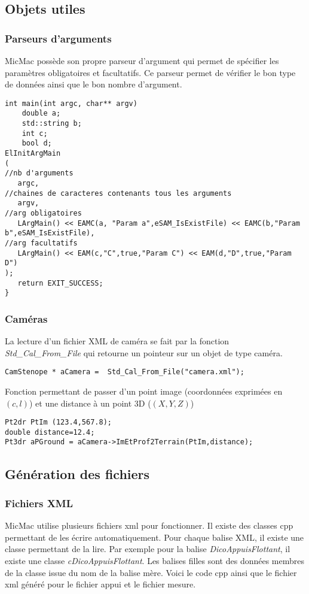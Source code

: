 \documentclass{article}
\begin{document}
\subsection{Objets utiles}

\subsubsection{Parseurs d'arguments}
MicMac possède son propre parseur d'argument qui permet de spécifier les paramètres obligatoires et facultatifs. 
Ce parseur permet de vérifier le bon type de données ainsi que le bon nombre d'argument.

\begin{verbatim}
int main(int argc, char** argv)
	double a;
	std::string b;
	int c;
	bool d;
ElInitArgMain
(
//nb d'arguments
   argc,
//chaines de caracteres contenants tous les arguments
   argv,
//arg obligatoires
   LArgMain() << EAMC(a, "Param a",eSAM_IsExistFile) << EAMC(b,"Param b",eSAM_IsExistFile), 
//arg facultatifs
   LArgMain() << EAM(c,"C",true,"Param C") << EAM(d,"D",true,"Param D")
);
   return EXIT_SUCCESS;
}
 \end{verbatim}   

\subsubsection{Caméras}
La lecture d'un fichier XML de caméra se fait par la fonction \emph{Std\_Cal\_From\_File} qui retourne un pointeur sur un objet de type caméra.
\begin{verbatim}
CamStenope * aCamera =  Std_Cal_From_File("camera.xml");
\end{verbatim}


Fonction permettant de passer d'un point image (coordonnées exprimées en $(c,l)$) et une distance à un point 3D ($(X,Y,Z)$)
\begin{verbatim}
Pt2dr PtIm (123.4,567.8);
double distance=12.4;
Pt3dr aPGround = aCamera->ImEtProf2Terrain(PtIm,distance);
\end{verbatim}

\subsection{Génération des fichiers}
\subsubsection{Fichiers XML}
MicMac utilise plusieurs fichiers xml pour fonctionner. 
Il existe des classes cpp permettant de les écrire automatiquement.
Pour chaque balise XML, il existe une classe permettant de la lire.
Par exemple pour la balise \emph{DicoAppuisFlottant}, il existe une classe \emph{cDicoAppuisFlottant}.
Les balises filles sont des données membres de la classe issue du nom de la balise mère.
Voici le code cpp ainsi que le fichier xml généré pour le fichier appui et le fichier mesure.
\end{document}
